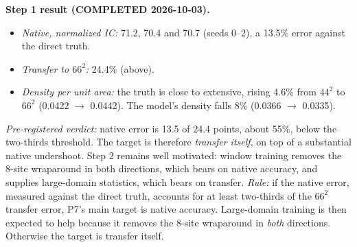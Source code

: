 \documentclass[11pt]{article}
\begin{document}
\textbf{Step 1 result (COMPLETED 2026-10-03).}
\begin{itemize}[leftmargin=*]
\item \emph{Native, normalized IC:} 71.2, 70.4 and 70.7 (seeds 0--2), a
  13.5\% error against the direct truth.
\item \emph{Transfer to $66^2$:} 24.4\% (above).
\item \emph{Density per unit area:} the truth is close to extensive,
  rising 4.6\% from $44^2$ to $66^2$ (0.0422 $\to$ 0.0442). The model's
  density falls 8\% (0.0366 $\to$ 0.0335).
\end{itemize}
\emph{Pre-registered verdict:} native error is 13.5 of 24.4 points, about
55\%, below the two-thirds threshold. The target is therefore
\emph{transfer itself}, on top of a substantial native undershoot. Step 2
remains well motivated: window training removes the 8-site wraparound in
both directions, which bears on native accuracy, and supplies
large-domain statistics, which bears on transfer.
\emph{Rule:} if the native error, measured against the direct truth,
accounts for at least two-thirds of the $66^2$ transfer error, P7's main
target is native accuracy. Large-domain training is then expected to
help because it removes the $8$-site wraparound in \emph{both}
directions. Otherwise the target is transfer itself.
\end{document}
